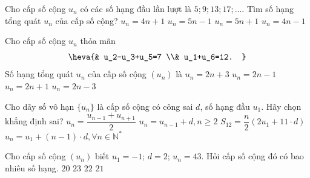 \begin{ex}%
	Cho cấp số cộng $u_n$ có các số hạng đầu lần lượt là $5;9;13;17;\ldots$. Tìm số hạng tổng quát $u_n$ của cấp số  cộng?
	\choice 
		{\True  $u_n=4n+1$}
		 {$u_n=5n-1$}
		 {$u_n=5n+1$}
		{$u_n=4n-1$} 
\end{ex}

\begin{ex}%
	 Cho cấp số cộng $u_n$ thỏa mãn
	\[ 
	\heva{& 
	u_2-u_3+u_5=7  \\&
	 u_1+u_6=12. }
	 \]
	Số  hạng tổng quát $u_n$ của cấp số cộng $(u_n)$ là
	 \choice
		{$u_n=2n+3$} 
		 {\True $u_n=2n-1$}
		{$u_n=2n+1$} 
		 {$u_n=2n-3$}
\end{ex}

\begin{ex}%
	Cho dãy số vô hạn $\{u_n\}$ là cấp số  cộng có công sai $d$, số hạng đầu $u_1$. Hãy chọn khẳng định sai?
	\choice 
		{$u_n = \dfrac{u_{n-1}+u_{n+1}}{2}$} 
		{$u_n = u_{n-1}+d, n \ge  2$}
		 {\True $S_{12} = \dfrac{n}{2}(2u_1+11\cdot d)$}
		 {$u_n = u_1+(n-1)\cdot d, \forall n \in \mathbb{N}^*$}
\end{ex}

\begin{ex}%
	Cho cấp số cộng $(u_n)$ biết $u_1 = -1$; $d = 2$; $u_n = 43$.  Hỏi cấp số cộng đó có bao nhiêu số hạng.
	\choice 
		{$20$} 
		 {\True $23$}
		 {$22$}
		{$21$} 
\end{ex}

